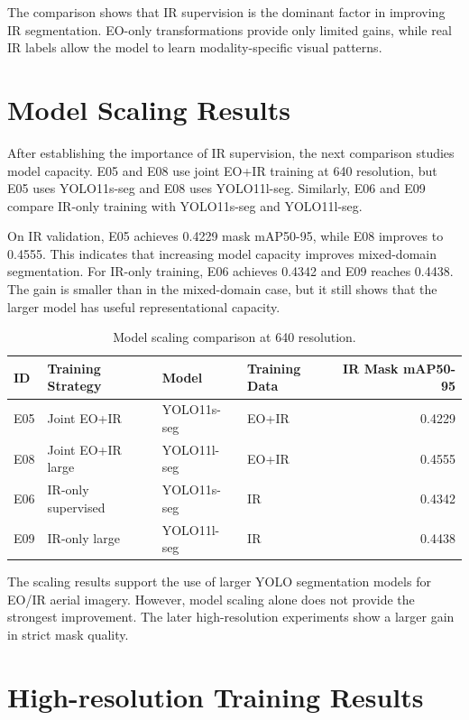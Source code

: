 The comparison shows that IR supervision is the dominant factor in improving IR segmentation. EO-only transformations provide only limited gains, while real IR labels allow the model to learn modality-specific visual patterns.

\section{Model Scaling Results}

After establishing the importance of IR supervision, the next comparison studies model capacity. E05 and E08 use joint EO+IR training at 640 resolution, but E05 uses YOLO11s-seg and E08 uses YOLO11l-seg. Similarly, E06 and E09 compare IR-only training with YOLO11s-seg and YOLO11l-seg.

On IR validation, E05 achieves 0.4229 mask mAP50-95, while E08 improves to 0.4555. This indicates that increasing model capacity improves mixed-domain segmentation. For IR-only training, E06 achieves 0.4342 and E09 reaches 0.4438. The gain is smaller than in the mixed-domain case, but it still shows that the larger model has useful representational capacity.

\begin{table}[h]
\centering
\caption{Model scaling comparison at 640 resolution.}
\label{tab:model_scaling_results}
\begin{tabular}{llllr}
\hline
\textbf{ID} & \textbf{Training Strategy} & \textbf{Model} & \textbf{Training Data} & \textbf{IR Mask mAP50-95} \\
\hline
E05 & Joint EO+IR & YOLO11s-seg & EO+IR & 0.4229 \\
E08 & Joint EO+IR large & YOLO11l-seg & EO+IR & 0.4555 \\
E06 & IR-only supervised & YOLO11s-seg & IR & 0.4342 \\
E09 & IR-only large & YOLO11l-seg & IR & 0.4438 \\
\hline
\end{tabular}
\end{table}

The scaling results support the use of larger YOLO segmentation models for EO/IR aerial imagery. However, model scaling alone does not provide the strongest improvement. The later high-resolution experiments show a larger gain in strict mask quality.

\section{High-resolution Training Results}

